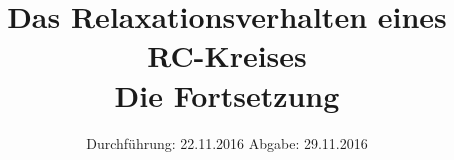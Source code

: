 

\subject{V353}
\title{Das Relaxationsverhalten eines RC-Kreises\\ Die Fortsetzung}
\date{
	Durchführung: 22.11.2016
	\hspace{4em}
	Abgabe: 29.11.2016
}


	\maketitle
	\newpage
	\tableofcontents
	\newpage
	
	
	
	
	
	\newpage
	
	\printbibliography

